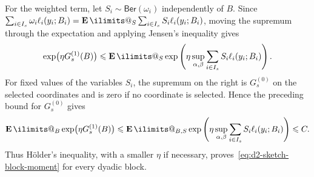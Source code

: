 \documentclass[11pt, letterpaper, hidelinks]{article}
\makeatletter
\renewcommand{\proofname}{\textit{\textbf{Proof}}}
\renewenvironment{proof}[1][\proofname]{\par\pushQED{\qed}\normalfont \topsep6\p@\@plus6\p@\relax\trivlist\item[\hskip\labelsep#1\@addpunct{}]\ignorespaces}{\popQED\endtrivlist\@endpefalse}
\newcommand{\proofsketchname}{\textit{\textbf{Proof sketch}}}
\newenvironment{proofsketch}
  {\begin{proof}[\proofsketchname]}
  {\end{proof}}
\newcommand{\1}{\mathbf 1}
\renewcommand{\leq}{\leqslant}
\newcommand{\E}{\operatorname*{\mathbf{E}}\ilimits@}
\theoremstyle{plain}
\theoremstyle{definition}
\newcommand{\Ber}[1]{\mathsf{Ber}\left(#1\right)}
\makeatother
\begin{document}
\begin{proofsketch}
For the weighted term, let $S_i\sim\Ber{\omega_i}$ independently of $B$.
Since $\sum_{i\in I_s}\omega_i\ell_i(y_i;B_i)
=\E_S\sum_{i\in I_s}S_i\ell_i(y_i;B_i)$, moving the supremum through the
expectation and applying Jensen's inequality gives
\[
\exp\bigl(\eta G_s^{(1)}(B)\bigr)
\leq\E_S\exp\left(\eta\sup_{\alpha,\beta}
\sum_{i\in I_s}S_i\ell_i(y_i;B_i)\right).
\]
For fixed values of the variables $S_i$, the supremum on the right is
$G_s^{(0)}$ on the selected coordinates and is zero if no coordinate is
selected.
Hence the preceding bound for $G_s^{(0)}$ gives
\[
\E_B\exp\bigl(\eta G_s^{(1)}(B)\bigr)
\leq\E_{B,S}\exp\left(\eta\sup_{\alpha,\beta}
\sum_{i\in I_s}S_i\ell_i(y_i;B_i)\right)\leq C.
\]
Thus H\"older's inequality, with a smaller $\eta$ if necessary,
proves~\eqref{eq:d2-sketch-block-moment} for every dyadic block.


\end{proofsketch}
\end{document}
